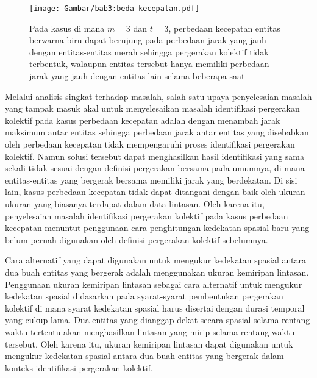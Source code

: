 \begin{figure}[t]
    \centering
    \texttt{[image: Gambar/bab3:beda-kecepatan.pdf]}
    \caption[Masalah identifikasi pada kasus perbedaan kecepatan]{Pada kasus di mana $m = 3$ dan $t = 3$, perbedaan kecepatan entitas berwarna biru dapat berujung pada perbedaan jarak yang jauh dengan entitas-entitas merah sehingga pergerakan kolektif tidak terbentuk, walaupun entitas tersebut hanya memiliki perbedaan jarak yang jauh dengan entitas lain selama beberapa saat}
    \label{bab3:masalah-kecepatan}
\end{figure}
    
Melalui analisis singkat terhadap masalah, salah satu upaya penyelesaian masalah yang tampak masuk akal untuk menyelesaikan masalah identifikasi pergerakan kolektif pada kasus perbedaan kecepatan adalah dengan menambah jarak maksimum antar entitas sehingga perbedaan jarak antar entitas yang disebabkan oleh perbedaan kecepatan tidak mempengaruhi proses identifikasi pergerakan kolektif. Namun solusi tersebut dapat menghasilkan hasil identifikasi yang sama sekali tidak sesuai dengan definisi pergerakan bersama pada umumnya, di mana entitas-entitas yang bergerak bersama memiliki jarak yang berdekatan. Di sisi lain, kasus perbedaan kecepatan tidak dapat ditangani dengan baik oleh ukuran-ukuran yang biasanya terdapat dalam data lintasan. Oleh karena itu, penyelesaian masalah identifikasi pergerakan kolektif pada kasus perbedaan kecepatan menuntut penggunaan cara penghitungan kedekatan spasial baru yang belum pernah digunakan oleh definisi pergerakan kolektif sebelumnya.

Cara alternatif yang dapat digunakan untuk mengukur kedekatan spasial antara dua buah entitas yang bergerak adalah menggunakan ukuran kemiripan lintasan. Penggunaan ukuran kemiripan lintasan sebagai cara alternatif untuk mengukur kedekatan spasial didasarkan pada syarat-syarat pembentukan pergerakan kolektif di mana syarat kedekatan spasial harus disertai dengan durasi temporal yang cukup lama. Dua entitas yang dianggap dekat secara spasial selama rentang waktu tertentu akan menghasilkan lintasan yang mirip selama rentang waktu tersebut. Oleh karena itu, ukuran kemiripan lintasan dapat digunakan untuk mengukur kedekatan spasial antara dua buah entitas yang bergerak dalam konteks identifikasi pergerakan kolektif.

